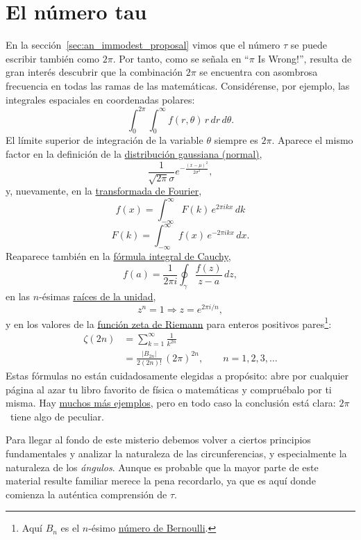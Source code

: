 
\section{El número tau} %
\label{sec:the_number_tau}

En la sección~\ref{sec:an_immodest_proposal} vimos que el número $\tau$ se puede escribir también como $2\pi$. Por tanto, como se señala en ``$\pi$ Is Wrong!'', resulta de gran interés descubrir que la combinación $2\pi$ se encuentra con asombrosa frecuencia en todas las ramas de las matemáticas. Considérense, por ejemplo, las integrales espaciales en coordenadas polares:
\[
  \int_0^{2\pi}\int_0^\infty f(r, \theta)\, r\, dr\, d\theta.
\]
El límite superior de integración de la variable $\theta$ siempre es $2\pi$. Aparece el mismo factor en la definición de la \href{https://es.wikipedia.org/wiki/Distribución_normal}{distribución gaussiana (normal)},
\[
  \frac{1}{\sqrt{2\pi}\sigma}e^{-\frac{(x-\mu)^2}{2\sigma^2}},
\]
y, nuevamente, en la  \href{http://mathworld.wolfram.com/FourierTransform.html}{transformada de Fourier},
\[
  f(x) = \int_{-\infty}^\infty F(k)\, e^{2\pi ikx}\,dk
\]
\[
    F(k) = \int_{-\infty}^\infty f(x)\, e^{-2\pi ikx}\,dx.
\]
Reaparece también en la \href{https://es.wikipedia.org/wiki/Fórmula_integral_de_Cauchy}{fórmula integral de Cauchy},
\[
  f(a) = \frac{1}{2\pi i}\oint_\gamma\frac{f(z)}{z-a}\,dz,
\]
en las $n$-ésimas \href{https://es.wikipedia.org/wiki/Raíz_de_la_unidad}{raíces de la unidad},
\[
  z^n = 1 \Rightarrow z = e^{2\pi i/n},
\]
y en los valores de la \href{https://es.wikipedia.org/wiki/Función_zeta_de_Riemann}{función zeta de Riemann} para enteros positivos pares\footnote{Aquí $B_n$ es el $n$-ésimo \href{https://es.wikipedia.org/wiki/Número_de_Bernoulli}{número de Bernoulli}.}:
\[
\begin{split}
  \zeta(2n) & = \sum_{k=1}^\infty \frac{1}{k^{2n}} \\
            & = \frac{|B_{2n}|}{2(2n)!}\,(2\pi)^{2n},\qquad n = 1, 2, 3, \ldots
\end{split}
\]
Estas fórmulas no están cuidadosamente elegidas a propósito: abre por cualquier página al azar tu libro favorito de física o matemáticas y compruébalo por ti misma. Hay \href{http://www.harremoes.dk/Peter/Undervis/Turnpage/Turnpage1.html}{muchos más ejemplos}, pero en todo caso la conclusión está clara: $2\pi$~tiene algo de peculiar.

Para llegar al fondo de este misterio debemos volver a ciertos principios fundamentales y analizar la naturaleza de las circunferencias, y especialmente la naturaleza de los \emph{ángulos}. Aunque es probable que la mayor parte de este material resulte familiar merece la pena recordarlo, ya que es aquí donde comienza la auténtica comprensión de $\tau$.

